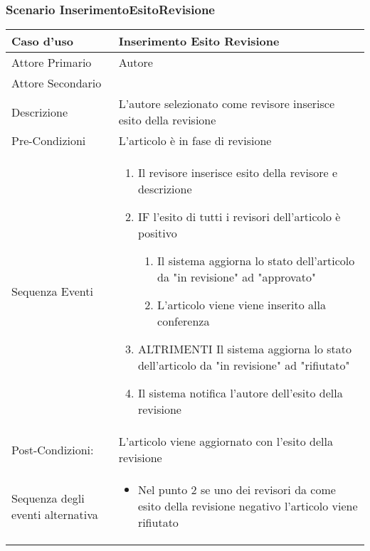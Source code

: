\subsubsection{Scenario InserimentoEsitoRevisione}
\begin{tabular}{|p{3cm}|p{7cm}|}
\hline 
\rowcolor{Orchid}
Caso d'uso & Inserimento Esito Revisione\\
\hline
Attore Primario & Autore \\
\hline
Attore Secondario & \\
\hline
Descrizione & L'autore selezionato come revisore inserisce esito della revisione\\
\hline
Pre-Condizioni& L'articolo è in fase di revisione\\
\hline
  Sequenza Eventi&
                   \begin{enumerate}
                   \item Il revisore inserisce esito della revisore e descrizione
                   \item IF l'esito di tutti i revisori dell'articolo è positivo
                   \begin{enumerate}
                    \item Il sistema aggiorna lo stato dell'articolo da "in revisione" ad "approvato" 
                    \item L'articolo viene viene inserito alla conferenza
                   \end{enumerate}
                   \item ALTRIMENTI Il sistema aggiorna lo stato dell'articolo da "in revisione" ad "rifiutato"
                   \item Il sistema notifica l'autore dell'esito della revisione
                   \end{enumerate}\\
\hline
Post-Condizioni: & L'articolo viene aggiornato con l'esito della revisione\\
\hline
Sequenza degli eventi alternativa & \begin{itemize}
  \item Nel punto 2 se uno dei revisori da come esito della revisione negativo l'articolo viene rifiutato
\end{itemize} \\
\hline
\end{tabular}


